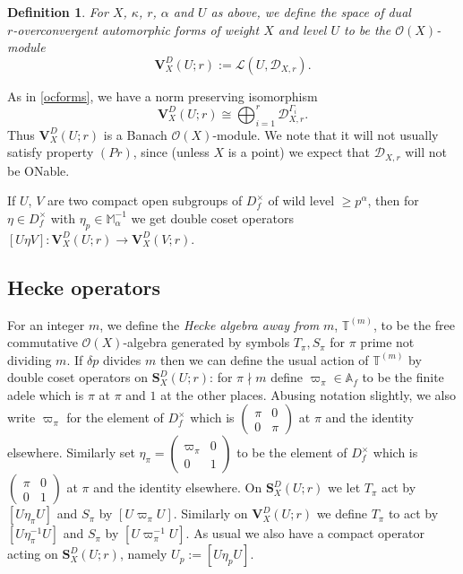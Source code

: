 \documentclass[a4paper, notitlepage]{amsart}
\newcommand{\A}{\ensuremath{\mathbb{A}}\xspace}
\newcommand{\OO}{\ensuremath{\mathscr{O}}\xspace}
\newtheorem{definition}[theorem]{Definition}
\newcommand{\OC}{\ensuremath{\mathbf{S}^D_{X}(U;r)}\xspace}
\newcommand{\OCd}{\ensuremath{\mathbf{V}^D_{X}(U;r)}\xspace}
\begin{document}
\begin{definition}
For $X$, $\kappa$, $r$, $\alpha$ and $U$ as above, we define the space of \emph{dual} \\$r$-overconvergent automorphic forms of weight $X$ and level $U$ to be the $\OO(X)$-module
$$\mathbf{V}^D_{X}(U;r):=\mathscr{L}(U,\mathscr{D}_{X,r}).$$
\end{definition}

As in \ref{ocforms}, we have a norm preserving isomorphism \begin{equation}\mathbf{V}^D_{X}(U;r)\cong \bigoplus_{i=1}^r \mathscr{D}_{X,r}^{\Gamma_i}.\label{dualiso}\end{equation} Thus $\mathbf{V}^D_{X}(U;r)$ is a Banach $\OO(X)$-module. We note that it will not usually satisfy property $(Pr)$, since (unless $X$ is a point)  we expect that $\mathscr{D}_{X,r}$ will not be ONable.

If $U$, $V$ are two compact open subgroups of $D_f^\times$ of wild level $\geq p^\alpha$, then for $\eta\in D_f^\times$ with $\eta_p \in \mathbb{M}_\alpha^{-1}$ we get double coset operators $[U\eta V]:\mathbf{V}^D_{X}(U;r) \rightarrow \mathbf{V}^D_{X}(V;r)$.

\subsection{Hecke operators}
For an integer $m$, we define the \emph{Hecke algebra away from} $m$, $\mathbb{T}^{(m)}$,  to be the free commutative $\OO(X)$-algebra generated by symbols $T_\pi, S_\pi$ for $\pi$ prime not dividing $m$. If $\delta p$ divides $m$ then we can define the usual action of $\mathbb{T}^{(m)}$ by double coset operators on $\OC$: for $\pi\nmid m$ define $\varpi_\pi\in\A_f$ to be the finite adele which is $\pi$ at $\pi$ and $1$ at the other places. Abusing notation slightly, we also write $\varpi_\pi$ for the element of $D_f^\times$ which is $\begin{pmatrix}
\pi & 0\\0&\pi
\end{pmatrix}$ at $\pi$ and the identity elsewhere. Similarly set $\eta_\pi=\begin{pmatrix}
\varpi_\pi & 0\\0&1
\end{pmatrix}$ to be the element of $D_f^\times$ which is $\begin{pmatrix}
\pi & 0\\0&1
\end{pmatrix}$ at $\pi$ and the identity elsewhere. On $\OC$ we let $T_\pi$ act by $[U\eta_\pi U]$ and $S_\pi$ by $[U\varpi_\pi U]$.
Similarly on $\OCd$ we define $T_\pi$ to act by $[U\eta_\pi^{-1}U]$ and $S_\pi$ by $[U\varpi_\pi^{-1} U]$. 
As usual we also have a compact operator acting on $\OC$, namely $U_p:=[U \eta_p U]$.
\end{document}
